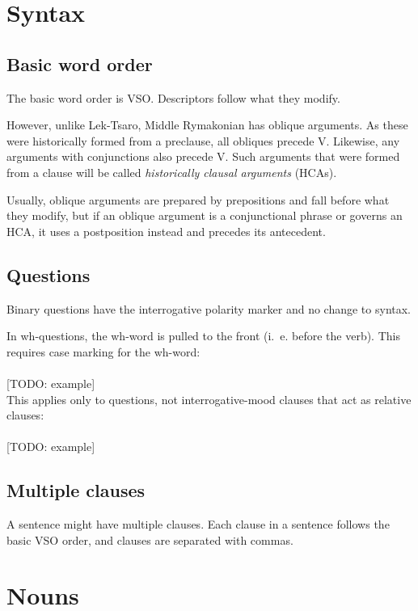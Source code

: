 \documentclass{book}
\newcommand{\lname}{Middle Rymakonian}
\begin{document}
\chapter{Syntax}

\section{Basic word order}

The basic word order is VSO. Descriptors follow what they modify.

However, unlike Lek-Tsaro, \lname{} has oblique arguments. As these were historically formed from a preclause, all obliques precede V. Likewise, any arguments with conjunctions also precede V. Such arguments that were formed from a clause will be called \emph{historically clausal arguments} (HCAs).

Usually, oblique arguments are prepared by prepositions and fall before what they modify, but if an oblique argument is a conjunctional phrase or governs an HCA, it uses a postposition instead and precedes its antecedent.

\section{Questions}

Binary questions have the interrogative polarity marker and no change to syntax.

In wh-questions, the wh-word is pulled to the front (i.~e. before the verb). This requires case marking for the wh-word: \\
~\\
{}[TODO: example] \\

This applies only to questions, not interrogative-mood clauses that act as relative clauses: \\
~\\
{}[TODO: example]

\section{Multiple clauses}

A sentence might have multiple clauses. Each clause in a sentence follows the basic VSO order, and clauses are separated with commas.

\chapter{Nouns}
\end{document}
